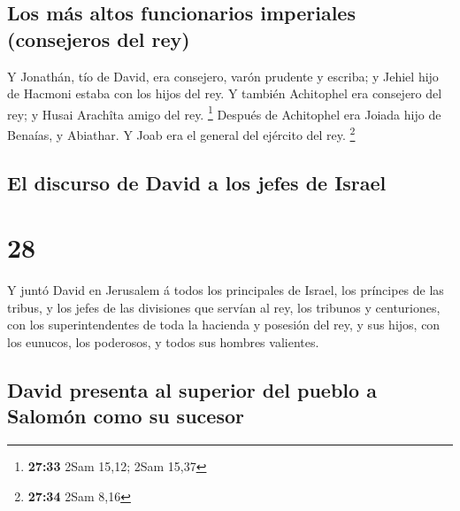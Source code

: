 \hypertarget{los-muxe1s-altos-funcionarios-imperiales-consejeros-del-rey}{%
\subsection{Los más altos funcionarios imperiales (consejeros del
rey)}\label{los-muxe1s-altos-funcionarios-imperiales-consejeros-del-rey}}

 Y Jonathán, tío de David, era consejero, varón prudente y
escriba; y Jehiel hijo de Hacmoni estaba con los hijos del rey.
 Y también Achitophel era consejero del rey; y Husai
Arachîta amigo del rey. \footnote{\textbf{27:33} 2Sam 15,12; 2Sam 15,37}
 Después de Achitophel era Joiada hijo de Benaías, y
Abiathar. Y Joab era el general del ejército del rey. \footnote{\textbf{27:34}
  2Sam 8,16}

\hypertarget{el-discurso-de-david-a-los-jefes-de-israel}{%
\subsection{El discurso de David a los jefes de
Israel}\label{el-discurso-de-david-a-los-jefes-de-israel}}

\hypertarget{section-27}{%
\section{28}\label{section-27}}

 Y juntó David en Jerusalem á todos los principales de
Israel, los príncipes de las tribus, y los jefes de las divisiones que
servían al rey, los tribunos y centuriones, con los superintendentes de
toda la hacienda y posesión del rey, y sus hijos, con los eunucos, los
poderosos, y todos sus hombres valientes.

\hypertarget{david-presenta-al-superior-del-pueblo-a-salomuxf3n-como-su-sucesor}{%
\subsection{David presenta al superior del pueblo a Salomón como su
sucesor}\label{david-presenta-al-superior-del-pueblo-a-salomuxf3n-como-su-sucesor}}

